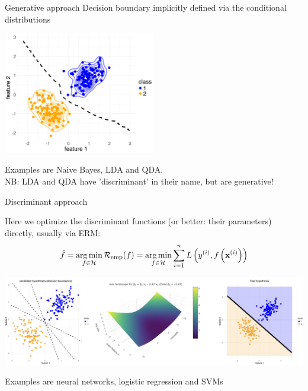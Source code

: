 \documentclass[11pt,compress,t,notes=noshow, xcolor=table]{beamer}
\begin{document}
\begin{vbframe}{Generative approach}
Decision boundary implicitly defined via the conditional distributions

\begin{center}
\includegraphics[width=0.5\textwidth]{figure/approach_generative.png} 
\end{center}


Examples are Naive Bayes, LDA and QDA. \\
NB: LDA and QDA have 'discriminant' in their name, but are generative!
\end{vbframe}

\begin{vbframe}{Discriminant approach}

Here we optimize the discriminant functions (or better: their parameters) directly, usually via ERM:
$$ \hat{f} = \operatorname*{arg\,min}_{f \in \mathcal{H}} \mathcal{R}_{\text{emp}}(f) = \operatorname*{arg\,min}_{f \in \mathcal{H}} \sum\limits_{i=1}^n L\left(y^{(i)}, f\left(\mathbf{x}^{(i)}\right)\right)$$

\begin{center}
\includegraphics[width=1.1\textwidth]{figure_man/disc_approach.png} 
\end{center}

Examples are neural networks, logistic regression and SVMs

\end{vbframe}

\endlecture
\end{document}
